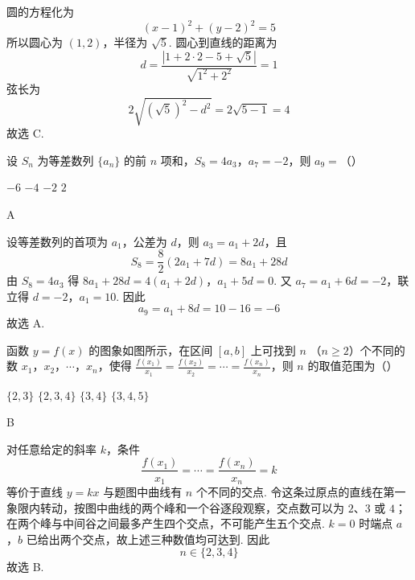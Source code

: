 \begin{solution}
圆的方程化为
\[
(x-1)^2+(y-2)^2=5
\]
所以圆心为 \((1,2)\)，半径为 \(\sqrt5\). 圆心到直线的距离为
\[
d=\frac{|1+2\cdot2-5+\sqrt5|}{\sqrt{1^2+2^2}}=1
\]
弦长为
\[
2\sqrt{(\sqrt5)^2-d^2}=2\sqrt{5-1}=4
\]
故选 C.
\end{solution}

\begin{problem}
设 \(S_{n}\) 为等差数列 \(\{a_{n}\}\) 的前 \(n\) 项和，\(S_{8} = 4a_{3}\)，\(a_{7} = -2\)，则 \(a_{9} =\)（\quad）

\choices
    {\(-6\)}
    {\(-4\)}
    {\(-2\)}
    {\(2\)}
\end{problem}

\begin{answer}
A
\end{answer}

\begin{solution}
设等差数列的首项为 \(a_1\)，公差为 \(d\)，则 \(a_3=a_1+2d\)，且
\[
S_8=\frac{8}{2}(2a_1+7d)=8a_1+28d
\]
由 \(S_8=4a_3\) 得
\(8a_1+28d=4(a_1+2d)\)，\(a_1+5d=0\).
又 \(a_7=a_1+6d=-2\)，联立得 \(d=-2\)，\(a_1=10\). 因此
\[
a_9=a_1+8d=10-16=-6
\]
故选 A.
\end{solution}

\begin{problem}
函数 \( y = f(x) \) 的图象如图所示，在区间 \([a, b]\) 上可找到 \( n  \) （\(n \geqslant 2\)）个不同的数 \(x_1\)，\(x_2\)，\(\cdots\)，\(x_n\)，使得 \( \frac{f(x_1)}{x_1} = \frac{f(x_2)}{x_2} = \cdots = \frac{f(x_n)}{x_n} \)，则 \( n \) 的取值范围为（\quad）


\choices
    {\(\{2, 3\}\)}
    {\(\{2, 3, 4\}\)}
    {\(\{3, 4\}\)}
    {\(\{3, 4, 5\}\)}
\end{problem}

\begin{answer}
B
\end{answer}

\begin{solution}
对任意给定的斜率 \(k\)，条件
\[
\frac{f(x_1)}{x_1}=\cdots=\frac{f(x_n)}{x_n}=k
\]
等价于直线 \(y=kx\) 与题图中曲线有 \(n\) 个不同的交点. 令这条过原点的直线在第一象限内转动，按图中曲线的两个峰和一个谷逐段观察，交点数可以为 \(2\)、\(3\) 或 \(4\)；在两个峰与中间谷之间最多产生四个交点，不可能产生五个交点. \(k=0\) 时端点 \(a\)，\(b\) 已给出两个交点，故上述三种数值均可达到. 因此
\[
n\in\{2,3,4\}
\]
故选 B.
\end{solution}


